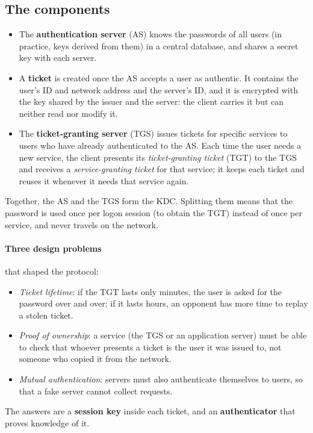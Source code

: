 \subsection{The components}

\begin{itemize}
    \item The \textbf{authentication server} (AS) knows the passwords of all users (in practice, keys derived from them) in a central database, and shares a secret key with each server.
    \item A \textbf{ticket} is created once the AS accepts a user as authentic. It contains the user's ID and network address and the server's ID, and it is encrypted with the key shared by the issuer and the server: the client carries it but can neither read nor modify it.
    \item The \textbf{ticket-granting server} (TGS) issues tickets for specific services to users who have already authenticated to the AS. Each time the user needs a new service, the client presents its \emph{ticket-granting ticket} (TGT) to the TGS and receives a \emph{service-granting ticket} for that service; it keeps each ticket and reuses it whenever it needs that service again.
\end{itemize}
Together, the AS and the TGS form the KDC. Splitting them means that the password is used once per logon session (to obtain the TGT) instead of once per service, and never travels on the network.

\paragraph{Three design problems} that shaped the protocol:
\begin{itemize}
    \item \emph{Ticket lifetime}: if the TGT lasts only minutes, the user is asked for the password over and over; if it lasts hours, an opponent has more time to replay a stolen ticket.
    \item \emph{Proof of ownership}: a service (the TGS or an application server) must be able to check that whoever presents a ticket is the user it was issued to, not someone who copied it from the network.
    \item \emph{Mutual authentication}: servers must also authenticate themselves to users, so that a fake server cannot collect requests.
\end{itemize}
The answers are a \textbf{session key} inside each ticket, and an \textbf{authenticator} that proves knowledge of it.

